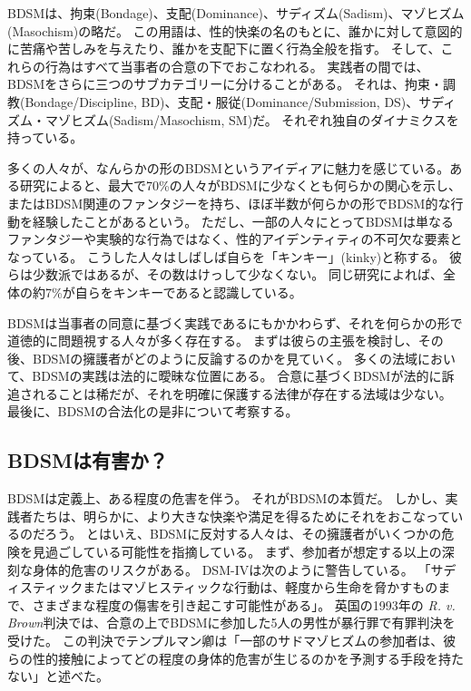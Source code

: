 \documentclass[paper=a4,book,openany]{jlreq} \usepackage{mystyle}
\begin{document}
BDSMは、拘束(Bondage)、支配(Dominance)、サディズム(Sadism)、マゾヒズム(Masochism)の略だ。
この用語は、性的快楽の名のもとに、誰かに対して意図的に苦痛や苦しみを与えたり、誰かを支配下に置く行為全般を指す。
そして、これらの行為はすべて当事者の合意の下でおこなわれる。
実践者の間では、BDSMをさらに三つのサブカテゴリーに分けることがある。
それは、拘束・調教(Bondage/Discipline, BD)、支配・服従(Dominance/Submission, DS)、サディズム・マゾヒズム(Sadism/Masochism, SM)だ。
それぞれ独自のダイナミクスを持っている。

多くの人々が、なんらかの形のBDSMというアイディアに魅力を感じている。ある研究によると、最大で70\%の人々がBDSMに少なくとも何らかの関心を示し、またはBDSM関連のファンタジーを持ち、ほぼ半数が何らかの形でBDSM的な行動を経験したことがあるという\citep{holvoet17:_fifty_shades_belgian_gray}。
ただし、一部の人々にとってBDSMは単なるファンタジーや実験的な行為ではなく、性的アイデンティティの不可欠な要素となっている。
こうした人々はしばしば自らを「キンキー」(kinky)と称する。
彼らは少数派ではあるが、その数はけっして少なくない。
同じ研究によれば、全体の約7\%が自らをキンキーであると認識している。

BDSMは当事者の同意に基づく実践であるにもかかわらず、それを何らかの形で道徳的に問題視する人々が多く存在する。
まずは彼らの主張を検討し、その後、BDSMの擁護者がどのように反論するのかを見ていく。
多くの法域において、BDSMの実践は法的に曖昧な位置にある。
合意に基づくBDSMが法的に訴追されることは稀だが、それを明確に保護する法律が存在する法域は少ない。
最後に、BDSMの合法化の是非について考察する。

\subsection{BDSMは有害か？}

BDSMは定義上、ある程度の危害を伴う。
それがBDSMの本質だ。
しかし、実践者たちは、明らかに、より大きな快楽や満足を得るためにそれをおこなっているのだろう。
とはいえ、BDSMに反対する人々は、その擁護者がいくつかの危険を見過ごしている可能性を指摘している。
まず、参加者が想定する以上の深刻な身体的危害のリスクがある。
DSM-IVは次のように警告している。
「サディスティックまたはマゾヒスティックな行動は、軽度から生命を脅かすものまで、さまざまな程度の傷害を引き起こす可能性がある」\citep[p.567]{DSM4}。
英国の1993年の \emph{R. v. Brown}判決では、合意の上でBDSMに参加した5人の男性が暴行罪で有罪判決を受けた。
この判決でテンプルマン卿は「一部のサドマゾヒズムの参加者は、彼らの性的接触によってどの程度の身体的危害が生じるのかを予測する手段を持たない」と述べた。
\end{document}

